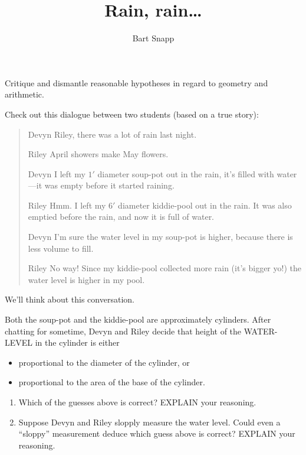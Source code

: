\documentclass[nooutcomes,noauthor,hints]{ximera}
\title{Rain, rain\dots}
\author{Bart Snapp}
\begin{document}
\begin{abstract}
  
\end{abstract}
\maketitle

\begin{listOutcomes}
\item Critique and dismantle reasonable hypotheses in regard to
  geometry and arithmetic.
\end{listOutcomes}
Check out this dialogue between two students (based on a true story):

\begin{mdframed}[style=OutcomeStyle]
  \begin{quote}
\begin{dialogue}
\item[Devyn] Riley, there was a lot of rain last night.
\item[Riley] April showers make May flowers. 
\item[Devyn] I left my $1'$ diameter soup-pot out in the rain, it's
  filled with water---it was empty before it started raining.
\item[Riley] Hmm. I left my $6'$ diameter kiddie-pool out in the rain.
  It was also emptied before the rain, and now it is full of water.
\item[Devyn] I'm sure the water level in my soup-pot is higher,
  because there is less volume to fill.
\item[Riley] No way! Since my kiddie-pool collected more rain (it's
  bigger yo!) the water level is higher in my pool.
\end{dialogue}
  \end{quote}
\end{mdframed}
We'll think about this conversation.




\mynewpage


\begin{question}
  Both the soup-pot and the kiddie-pool are approximately cylinders.
  After chatting for sometime, Devyn and Riley decide that height of
  the WATER-LEVEL in the cylinder is either
  \begin{itemize}
  \item proportional to the diameter of the cylinder, or
  \item proportional to the area of the base of the cylinder.
  \end{itemize}
  \begin{enumerate}
  \item Which of the guesses above is correct? EXPLAIN your reasoning.
  \item Suppose Devyn and Riley slopply measure the water level. Could
    even a ``sloppy'' measurement deduce which guess above is correct?
    EXPLAIN your reasoning.
  \end{enumerate}
\end{question}
\mynewpage
\end{document}
